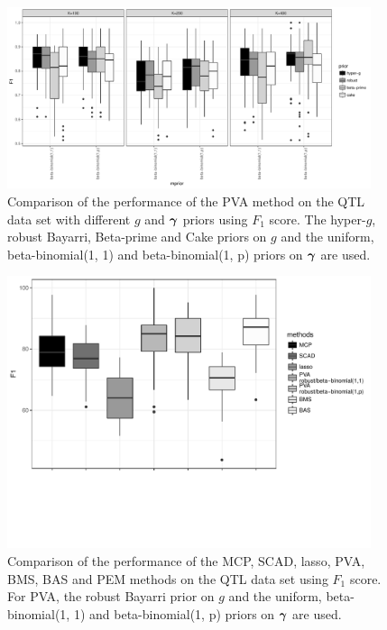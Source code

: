\begin{figure}[h!]
	\begin{center}	
		\includegraphics[width=0.95\textwidth]{./qtlPVA_F1.pdf}  
	\end{center}
	\caption{Comparison of the performance of the PVA method on the
						QTL data set with different $g$ and ${\boldsymbol \gamma}$ priors using $F_1$ score.
						The hyper-$g$,
						robust Bayarri, Beta-prime and Cake priors on $g$ and the uniform, beta-binomial(1, 1) and beta-binomial(1, p) priors on ${\boldsymbol \gamma}$ are used.}
	\label{fig:qtlPVA_F1}
\end{figure}

\begin{figure}[h!]
	\begin{center}	
		\includegraphics[trim={0 4cm 0 0},width=0.95\textwidth]{./qtlPVA_F1_compare_edit.pdf}  
	\end{center}
	\caption{Comparison of the performance of the MCP, SCAD, lasso, PVA, BMS, BAS and PEM methods on the
						QTL data set using $F_1$ score. For PVA, the
						robust Bayarri prior on $g$ and the uniform, beta-binomial(1, 1) and beta-binomial(1, p) priors
						on ${\boldsymbol \gamma}$ are used.}
	\label{fig:qtlPVA_F1_compare}
\end{figure}


